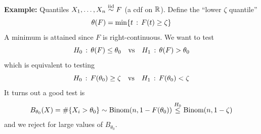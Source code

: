 \begin{example}{\textbf{Example:} Quantiles}
    $X_1, \ldots, X_n \overset{\text{iid}}{\sim} F$ (a cdf on $\mathbb{R}$). Define the ``lower $\zeta$ quantile''
    \[ \theta(F) = \min\{t \, :\, F(t) \geq \zeta\} \]
    A minimum is attained since $F$ is right-continuous. We want to test
    \[ H_0 \, :\, \theta(F) \leq \theta_0 \quad \text{vs} \quad H_1 \, :\, \theta(F) > \theta_0 \]
    which is equivalent to testing
    \[ H_0 \, :\, F(\theta_0) \geq \zeta \quad \text{vs} \quad H_1 \, :\, F(\theta_0) < \zeta \]
    It turns out a good test is
    \[ B_{\theta_0}(X) = \#\{X_i > \theta_0\} \sim \text{Binom}(n, 1 - F(\theta_0)) \overset{H_0}{\leq} \text{Binom}(n, 1 - \zeta) \]
    and we reject for large values of $B_{\theta_0}$.
\end{example}
